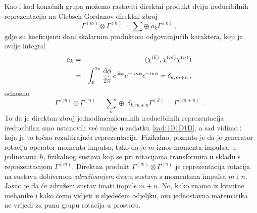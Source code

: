 Kao i kod konačnih grupa možemo rastaviti direktni produkt dviju
ireducibilnih reprezentacija na Clebsch-Gordanov direktni zbroj
\begin{displaymath}
  \Gamma^{(m)}\otimes\Gamma^{(n)} =
  \sum \oplus\: a_{k}\Gamma^{(k)}  \,,
\end{displaymath}
gdje su koeficijenti dani skalarnim produktom odgovarajućih karaktera,
koji je ovdje integral
\begin{eqnarray*}
a_{k} & = & (\chi^{(k)}, \chi^{(m)}\chi^{(n)}) \\
      & = & \int_{0}^{2\pi}\frac{\textrm{d} \phi}{2\pi}\,
    e^{\textrm{\scriptsize i} k \phi}e^{-\textrm{\scriptsize i} m \phi}e^{-\textrm{\scriptsize i} n \phi} = \delta_{k,m+n} \,,
\end{eqnarray*}
odnosno
\begin{displaymath}
  \Gamma^{(m)}\otimes\Gamma^{(n)} =
  \sum_{k} \oplus\: \delta_{k,m+n}\Gamma^{(k)} = \Gamma^{(m+n)} \;.
\end{displaymath}
To da je direktan zbroj jednodimenzionalnih ireducibilnih reprezentacija 
ireducibilan smo ustanovili već ranije u zadatku \ref{zad:1D1D1D}, a sad vidimo i koja je
to točno rezultirajuća reprezentacija. Fizikalno, poznato je da je generator
rotacija operator momenta impulsa, tako da je $m$ iznos momenta impulsa,
u jedinicama $\hbar$, fizikalnog sustava koji se pri rotacijama transformira
u skladu s reprezentacijom $\Gamma^{(m)}$. Direktan produkt $\Gamma^{(m)}\otimes\Gamma^{(n)}$
je reprezentacija rotacija na sustavu dobivenom \emph{združivanjem} dvaju sustava 
s momentima impulsa $m$ i $n$. Jasno je da će združeni sustav imati impuls $m+n$.
No, kako znamo iz kvantne mehanike i kako ćemo vidjeti u sljedećem odjeljku, ova
jednostavna matematika ne vrijedi za punu grupu rotacija u prostoru.


